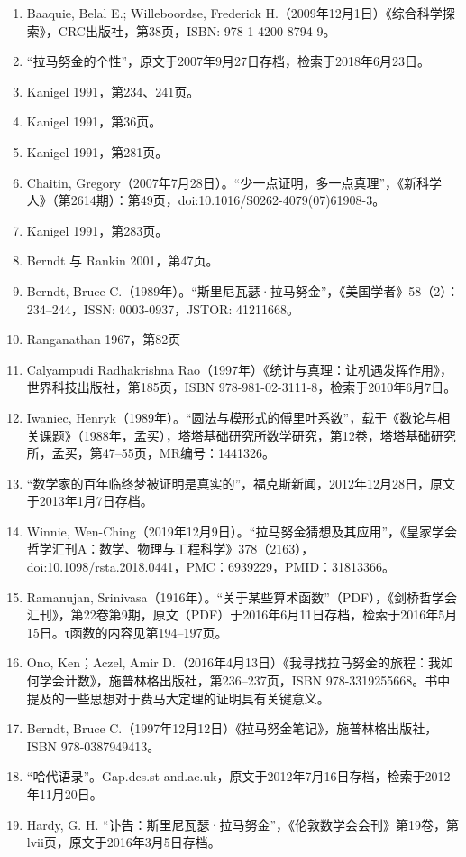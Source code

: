 \begin{enumerate}
\item Baaquie, Belal E.; Willeboordse, Frederick H.（2009年12月1日）《综合科学探索》，CRC出版社，第38页，ISBN: 978-1-4200-8794-9。
\item “拉马努金的个性”，原文于2007年9月27日存档，检索于2018年6月23日。
\item Kanigel 1991，第234、241页。
\item Kanigel 1991，第36页。
\item Kanigel 1991，第281页。
\item Chaitin, Gregory（2007年7月28日）。“少一点证明，多一点真理”，《新科学人》（第2614期）：第49页，doi:10.1016/S0262-4079(07)61908-3。
\item Kanigel 1991，第283页。
\item Berndt 与 Rankin 2001，第47页。
\item Berndt, Bruce C.（1989年）。“斯里尼瓦瑟·拉马努金”，《美国学者》58（2）：234–244，ISSN: 0003-0937，JSTOR: 41211668。
\item Ranganathan 1967，第82页
\item Calyampudi Radhakrishna Rao（1997年）《统计与真理：让机遇发挥作用》，世界科技出版社，第185页，ISBN 978-981-02-3111-8，检索于2010年6月7日。
\item Iwaniec, Henryk（1989年）。“圆法与模形式的傅里叶系数”，载于《数论与相关课题》（1988年，孟买），塔塔基础研究所数学研究，第12卷，塔塔基础研究所，孟买，第47–55页，MR编号：1441326。
\item “数学家的百年临终梦被证明是真实的”，福克斯新闻，2012年12月28日，原文于2013年1月7日存档。
\item Winnie, Wen-Ching（2019年12月9日）。“拉马努金猜想及其应用”，《皇家学会哲学汇刊A：数学、物理与工程科学》378（2163），doi:10.1098/rsta.2018.0441，PMC：6939229，PMID：31813366。
\item Ramanujan, Srinivasa（1916年）。“关于某些算术函数”（PDF），《剑桥哲学会汇刊》，第22卷第9期，原文（PDF）于2016年6月11日存档，检索于2016年5月15日。τ函数的内容见第194–197页。
\item Ono, Ken；Aczel, Amir D.（2016年4月13日）《我寻找拉马努金的旅程：我如何学会计数》，施普林格出版社，第236–237页，ISBN 978-3319255668。书中提及的一些思想对于费马大定理的证明具有关键意义。
\item Berndt, Bruce C.（1997年12月12日）《拉马努金笔记》，施普林格出版社，ISBN 978-0387949413。
\item “哈代语录”。Gap.dcs.st-and.ac.uk，原文于2012年7月16日存档，检索于2012年11月20日。
\item Hardy, G. H. “讣告：斯里尼瓦瑟·拉马努金”，《伦敦数学会会刊》第19卷，第lvii页，原文于2016年3月5日存档。

\end{enumerate}

